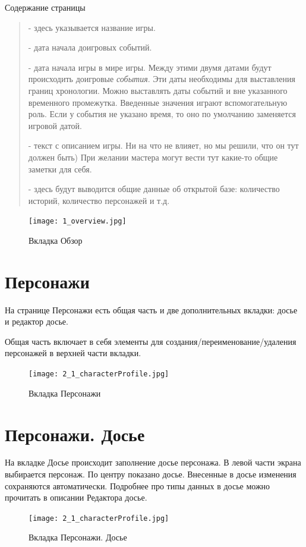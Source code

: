 \documentclass[a4paper,oneside,10pt,russian]{sphinxmanual}
\begin{document}
Содержание страницы
\begin{quote}

 - здесь указывается название игры.

 - дата начала доигровых событий.

 - дата начала игры в мире игры. Между этими двумя датами будут происходить доигровые \emph{события}. Эти даты необходимы для выставления границ хронологии. Можно выставлять даты событий и вне указанного временного промежутка. Введенные значения играют вспомогательную роль. Если у события не указано время, то оно по умолчанию заменяется игровой датой.

 - текст с описанием игры. Ни на что не влияет, но мы решили, что он тут должен быть) При желании мастера могут вести тут какие-то общие заметки для себя.

 - здесь будут выводится общие данные об открытой базе: количество историй, количество персонажей и т.д.
\end{quote}
\begin{figure}[H]
\centering
\capstart

\texttt{[image: 1\_overview.jpg]}
\caption{Вкладка Обзор}\end{figure}
\newpage

\section{Персонажи}
\label{pages:id4}\label{pages:characters-desc}
На странице Персонажи есть общая часть и две дополнительных вкладки: досье и редактор досье.

Общая часть включает в себя элементы для создания/переименование/удаления персонажей в верхней части вкладки.
\begin{figure}[H]
\centering
\capstart

\texttt{[image: 2\_1\_characterProfile.jpg]}
\caption{Вкладка Персонажи}\end{figure}
\newpage

\section{Персонажи. Досье}
\label{pages:id5}\label{pages:characters-profile}
На вкладке Досье происходит заполнение досье персонажа. В левой части экрана выбирается персонаж. По центру показано досье. Внесенные в досье изменения сохраняются автоматически. Подробнее про типы данных в досье можно прочитать в описании Редактора досье.
\begin{figure}[H]
\centering
\capstart

\texttt{[image: 2\_1\_characterProfile.jpg]}
\caption{Вкладка Персонажи. Досье}\end{figure}
\newpage
\end{document}
